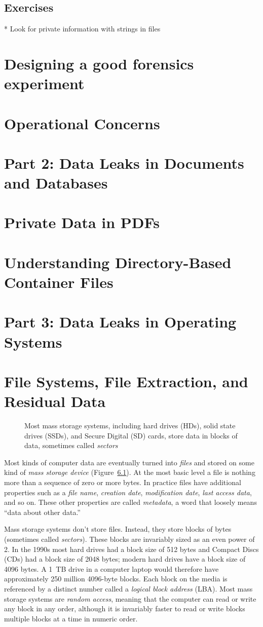 \documentclass[11pt,letter]{book}
\newcommand{\figref}[1]{Figure~\ref{#1}\xspace}
\newcommand{\sgraphic}[3][width=\linewidth]{
  \begin{figure}
  \begin{center}
  \fbox{\texttt{[image: \#2]}}
  \end{center}
  \caption{#3\label{#2}}
  \end{figure}
}
\begin{document}
\section{Exercises}
* Look for private information with strings in files

\chapter{Designing a good forensics experiment}
\chapter{Operational Concerns}
\chapter*{Part 2: Data Leaks in Documents and Databases}
\chapter{Private Data in PDFs}
\chapter{Understanding Directory-Based Container Files}
\chapter*{Part 3: Data Leaks in Operating Systems}
\chapter{File Systems, File Extraction, and Residual Data}
\sgraphic{art/TK}{Most mass storage systems, including hard drives (HDs),
  solid state drives (SSDs), and Secure Digital (SD) cards, store data
  in blocks of data, sometimes called \emph{sectors}}

Most kinds of computer data are eventually turned into \emph{files}
and stored on some kind of
\emph{mass storage device} (\figref{art/TK}). At the most basic level a file is
nothing more than a sequence of zero or more bytes. In practice files
have additional properties such as a \emph{file name}, 
\emph{creation date}, \emph{modification date}, \emph{last access
  data}, and so on. These other properties are called \emph{metadata},
a word that loosely means ``data about other data.''

Mass storage systems don't store files. Instead, they store blocks of
bytes (sometimes called \emph{sectors}). These blocks are invariably
sized as an even power of 2. In the 1990s most hard drives had a block
size of 512 bytes and Compact Discs (CDs) had a block size of 2048
bytes; modern hard drives have a block size of 4096 bytes. A 1~TB
drive in a computer laptop would therefore have approximately 250
million 4096-byte blocks. Each block on the media is referenced
by a distinct number called a \emph{logical block address} (LBA). Most
mass storage systems are \emph{random access}, meaning that the
computer can read or write any block in any order, although it is
invariably faster to read or write blocks multiple blocks at a time in numeric order.
\end{document}
